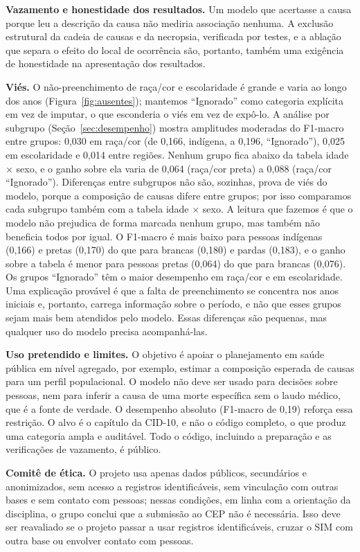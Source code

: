\documentclass[12pt]{article}
\begin{document}
\textbf{Vazamento e honestidade dos resultados.} Um modelo que acertasse a causa porque leu a descrição da causa não mediria associação nenhuma. A exclusão estrutural da cadeia de causas e da necropsia, verificada por testes, e a ablação que separa o efeito do local de ocorrência são, portanto, também uma exigência de honestidade na apresentação dos resultados.

\textbf{Viés.} O não-preenchimento de raça/cor e escolaridade é grande e varia ao longo dos anos (Figura~\ref{fig:ausentes}); mantemos ``Ignorado'' como categoria explícita em vez de imputar, o que esconderia o viés em vez de expô-lo. A análise por subgrupo (Seção~\ref{sec:desempenho}) mostra amplitudes moderadas do F1-macro entre grupos: 0,030 em raça/cor (de 0,166, indígena, a 0,196, ``Ignorado''), 0,025 em escolaridade e 0,014 entre regiões. Nenhum grupo fica abaixo da tabela idade $\times$ sexo, e o ganho sobre ela varia de 0,064 (raça/cor preta) a 0,088 (raça/cor ``Ignorado''). Diferenças entre subgrupos não são, sozinhas, prova de viés do modelo, porque a composição de causas difere entre grupos; por isso comparamos cada subgrupo também com a tabela idade $\times$ sexo. A leitura que fazemos é que o modelo não prejudica de forma marcada nenhum grupo, mas também não beneficia todos por igual. O F1-macro é mais baixo para pessoas indígenas (0,166) e pretas (0,170) do que para brancas (0,180) e pardas (0,183), e o ganho sobre a tabela é menor para pessoas pretas (0,064) do que para brancas (0,076). Os grupos ``Ignorado'' têm o maior desempenho em raça/cor e em escolaridade. Uma explicação provável é que a falta de preenchimento se concentra nos anos iniciais e, portanto, carrega informação sobre o período, e não que esses grupos sejam mais bem atendidos pelo modelo. Essas diferenças são pequenas, mas qualquer uso do modelo precisa acompanhá-las.

\textbf{Uso pretendido e limites.} O objetivo é apoiar o planejamento em saúde pública em nível agregado, por exemplo, estimar a composição esperada de causas para um perfil populacional. O modelo não deve ser usado para decisões sobre pessoas, nem para inferir a causa de uma morte específica sem o laudo médico, que é a fonte de verdade. O desempenho absoluto (F1-macro de 0,19) reforça essa restrição. O alvo é o capítulo da CID-10, e não o código completo, o que produz uma categoria ampla e auditável. Todo o código, incluindo a preparação e as verificações de vazamento, é público.

\textbf{Comitê de ética.} O projeto usa apenas dados públicos, secundários e anonimizados, sem acesso a registros identificáveis, sem vinculação com outras bases e sem contato com pessoas; nessas condições, em linha com a orientação da disciplina, o grupo conclui que a submissão ao CEP não é necessária. Isso deve ser reavaliado se o projeto passar a usar registros identificáveis, cruzar o SIM com outra base ou envolver contato com pessoas.
\end{document}
